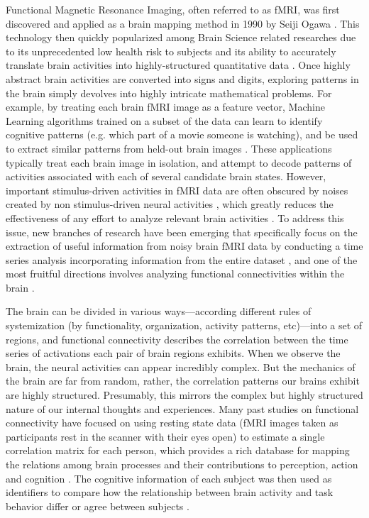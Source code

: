 \documentclass[11pt]{article}
\begin{document}
Functional Magnetic Resonance Imaging, often referred to as fMRI, was first discovered and applied as a brain mapping method in 1990 by Seiji Ogawa \citep{Ogawa90}. This technology then quickly popularized among Brain Science related researches due to its unprecedented low health risk to subjects and its ability to accurately translate brain activities into highly-structured quantitative data \citep{Logothetis01}\citep{Friston99}\citep{Friston98}. Once highly abstract brain activities are converted into signs and digits, exploring patterns in the brain simply devolves into highly intricate mathematical problems. For example, by treating each brain fMRI image as a feature vector, Machine Learning algorithms trained on a subset of the data can learn to identify cognitive patterns (e.g. which part of a movie someone is watching), and be used to extract similar patterns from held-out brain images \citep{Norman06}\citep{peterson12}\citep{peterson17}. These applications typically treat each brain image in isolation, and attempt to decode patterns of activities associated with each of several candidate brain states. However, important stimulus-driven activities in fMRI data are often obscured by noises created by non stimulus-driven neural activities \citep{peterson11}, which greatly reduces the effectiveness of any effort to analyze relevant brain activities \citep{hasson2009}. To address this issue, new branches of research have been emerging that specifically focus on the extraction of useful information from noisy brain fMRI data by conducting a time series analysis incorporating information from the entire dataset \citep{tang2017}, and one of the most fruitful directions involves analyzing functional connectivities within the brain \citep{peterson19} \citep{peterson20}.

The brain can be divided in various ways---according different rules of systemization (by functionality, organization, activity patterns, etc)---into a set of regions, and functional connectivity describes the correlation between the time series of activations each pair of brain regions exhibits. When we observe the brain, the neural activities can appear incredibly complex. But the mechanics of the brain are far from random, rather, the correlation patterns our brains exhibit are highly structured. Presumably, this mirrors the complex but highly structured nature of our internal thoughts and experiences. Many past studies on functional connectivity have focused on using resting state data (fMRI images taken as participants rest in the scanner with their eyes open) to estimate a single correlation matrix for each person, which provides a rich database for mapping the relations among brain processes and their contributions to perception, action and cognition \citep{peterson9}\citep{Bassett2017}. The cognitive information of each subject was then used as identifiers to compare how the relationship between brain activity and task behavior differ or agree between subjects \citep{Turke13}\citep{Rubinov2010}\citep{peterson10}.
\end{document}
